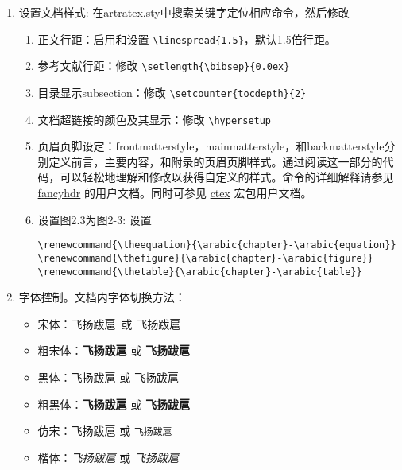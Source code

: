 \begin{enumerate}
        \verb+\chapter{item name}+  and \verb+\section*{item name}+

        来显式实现的 (请观察Backmatter.tex)，从而可以随意添加，放置，和修改，如同一般章节。对于图表目录名称则可在ucasthesis.cfg中进行修改。

    \item 设置文档样式: 在artratex.sty中搜索关键字定位相应命令，然后修改
        \begin{enumerate}
            \item 正文行距：启用和设置 \verb|\linespread{1.5}|，默认1.5倍行距。
            \item 参考文献行距：修改 \verb|\setlength{\bibsep}{0.0ex}|
            \item 目录显示subsection：修改 \verb|\setcounter{tocdepth}{2}|
            \item 文档超链接的颜色及其显示：修改 \verb|\hypersetup|
            \item 页眉页脚设定：frontmatterstyle，mainmatterstyle，和backmatterstyle分别定义前言，主要内容，和附录的页眉页脚样式。通过阅读这一部分的代码，可以轻松地理解和修改以获得自定义的样式。命令的详细解释请参见 \href{https://www.ctan.org/pkg/fancyhdr?lang=en}{fancyhdr} 的用户文档。同时可参见 \href{https://ctan.org/pkg/ctex?lang=en}{ctex} 宏包用户文档。

            \item 设置图2.3为图2-3: 设置
                {
                    \footnotesize
\begin{verbatim}
\renewcommand{\theequation}{\arabic{chapter}-\arabic{equation}}
\renewcommand{\thefigure}{\arabic{chapter}-\arabic{figure}}
\renewcommand{\thetable}{\arabic{chapter}-\arabic{table}}
\end{verbatim}
                }
        \end{enumerate}

    \item 字体控制。文档内字体切换方法：
        \begin{itemize}
            \item 宋体：飞扬跋扈~或 \textrm{飞扬跋扈}
            \item 粗宋体：{\bfseries 飞扬跋扈} 或 \textbf{飞扬跋扈}
            \item 黑体：{\sffamily 飞扬跋扈} 或 \textsf{飞扬跋扈}
            \item 粗黑体：{\bfseries\sffamily 飞扬跋扈} 或 \textsf{\bfseries 飞扬跋扈}
            \item 仿宋：{\ttfamily 飞扬跋扈} 或 \texttt{飞扬跋扈}
            \item 楷体：{\itshape 飞扬跋扈} 或 \textit{飞扬跋扈}
        \end{itemize}
        

\end{enumerate}
